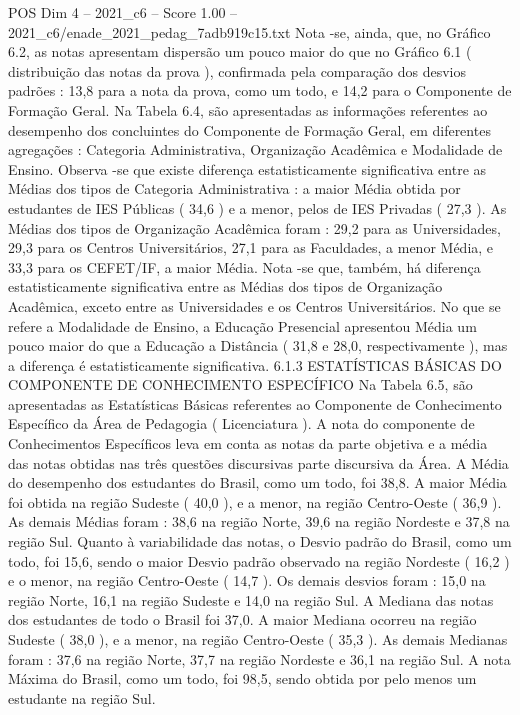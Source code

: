 \begin{textsample}{POS Dim 4 – 2021\_c6 – Score 1.00 – 2021\_c6/enade\_2021\_pedag\_7adb919c15.txt}
Nota -se, ainda, que, no Gráfico 6.2, as notas apresentam dispersão um pouco maior do que no Gráfico 6.1 ( distribuição das notas da prova ), confirmada pela comparação dos desvios padrões : 13,8 para a nota da prova, como um todo, e 14,2 para o Componente de Formação Geral.
Na Tabela 6.4, são apresentadas as informações referentes ao desempenho dos concluintes do Componente de Formação Geral, em diferentes agregações : Categoria Administrativa, Organização Acadêmica e Modalidade de Ensino.
Observa -se que existe diferença estatisticamente significativa entre as Médias dos tipos de Categoria Administrativa : a maior Média obtida por estudantes de IES Públicas ( 34,6 ) e a menor, pelos de IES Privadas ( 27,3 ).
As Médias dos tipos de Organização Acadêmica foram : 29,2 para as Universidades, 29,3 para os Centros Universitários, 27,1 para as Faculdades, a menor Média, e 33,3 para os CEFET/IF, a maior Média.
Nota -se que, também, há diferença estatisticamente significativa entre as Médias dos tipos de Organização Acadêmica, exceto entre as Universidades e os Centros Universitários.
No que se refere a Modalidade de Ensino, a Educação Presencial apresentou Média um pouco maior do que a Educação a Distância ( 31,8 e 28,0, respectivamente ), mas a diferença é estatisticamente significativa. 6.1.3 ESTATÍSTICAS BÁSICAS DO COMPONENTE DE CONHECIMENTO ESPECÍFICO Na Tabela 6.5, são apresentadas as Estatísticas Básicas referentes ao Componente de Conhecimento Específico da Área de Pedagogia ( Licenciatura ).
A nota do componente de Conhecimentos Específicos leva em conta as notas da parte objetiva e a média das notas obtidas nas três questões discursivas parte discursiva da Área.
A Média do desempenho dos estudantes do Brasil, como um todo, foi 38,8.
A maior Média foi obtida na região Sudeste ( 40,0 ), e a menor, na região Centro-Oeste ( 36,9 ).
As demais Médias foram : 38,6 na região Norte, 39,6 na região Nordeste e 37,8 na região Sul.
Quanto à variabilidade das notas, o Desvio padrão do Brasil, como um todo, foi 15,6, sendo o maior Desvio padrão observado na região Nordeste ( 16,2 ) e o menor, na região Centro-Oeste ( 14,7 ).
Os demais desvios foram : 15,0 na região Norte, 16,1 na região Sudeste e 14,0 na região Sul.
A Mediana das notas dos estudantes de todo o Brasil foi 37,0.
A maior Mediana ocorreu na região Sudeste ( 38,0 ), e a menor, na região Centro-Oeste ( 35,3 ).
As demais Medianas foram : 37,6 na região Norte, 37,7 na região Nordeste e 36,1 na região Sul.
A nota Máxima do Brasil, como um todo, foi 98,5, sendo obtida por pelo menos um estudante na região Sul.

\end{textsample}
